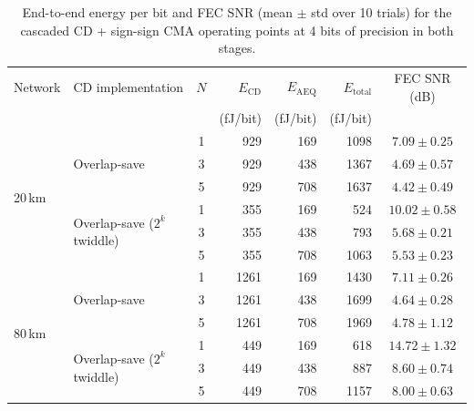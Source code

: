 \documentclass[12pt,a4paper]{article}
\begin{document}
\begin{table}[H]
    \centering
    \small
    \begin{tabular}{llcrrrc}
        \toprule
        Network & CD implementation & $N$ & $E_\mathrm{CD}$ & $E_\mathrm{AEQ}$ & $E_\mathrm{total}$ & FEC SNR (dB) \\
                &                   &     & (fJ/bit)        & (fJ/bit)         & (fJ/bit)           &              \\
        \midrule
        \multirow{6}{*}{20\,km} & \multirow{3}{*}{Overlap-save}                 & 1 &  929 & 169 & 1098 & $ 7.09 \pm 0.25$ \\
                                 &                                              & 3 &  929 & 438 & 1367 & $ 4.69 \pm 0.57$ \\
                                 &                                              & 5 &  929 & 708 & 1637 & $ 4.42 \pm 0.49$ \\
                                 \cmidrule(l){2-7}
                                 & \multirow{3}{*}{Overlap-save ($2^k$ twiddle)} & 1 &  355 & 169 &  524 & $10.02 \pm 0.58$ \\
                                 &                                              & 3 &  355 & 438 &  793 & $ 5.68 \pm 0.21$ \\
                                 &                                              & 5 &  355 & 708 & 1063 & $ 5.53 \pm 0.23$ \\
        \midrule
        \multirow{6}{*}{80\,km} & \multirow{3}{*}{Overlap-save}                 & 1 & 1261 & 169 & 1430 & $ 7.11 \pm 0.26$ \\
                                 &                                              & 3 & 1261 & 438 & 1699 & $ 4.64 \pm 0.28$ \\
                                 &                                              & 5 & 1261 & 708 & 1969 & $ 4.78 \pm 1.12$ \\
                                 \cmidrule(l){2-7}
                                 & \multirow{3}{*}{Overlap-save ($2^k$ twiddle)} & 1 &  449 & 169 &  618 & $14.72 \pm 1.32$ \\
                                 &                                              & 3 &  449 & 438 &  887 & $ 8.60 \pm 0.74$ \\
                                 &                                              & 5 &  449 & 708 & 1157 & $ 8.00 \pm 0.63$ \\
        \bottomrule
    \end{tabular}
    \caption{End-to-end energy per bit and FEC SNR (mean $\pm$ std over 10 trials) for the cascaded CD + sign-sign CMA operating points at 4 bits of precision in both stages.}
    \label{tab:combined_eq_summary}
\end{table}
\end{document}
